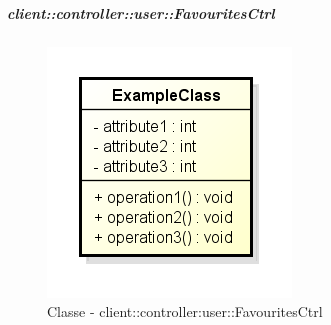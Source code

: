 		\subparagraph{client::controller::user::FavouritesCtrl} %
		\label{subp:client_controller_user_favouritesctrl}
			\begin{figure}[htbp]
				\centering
				\centerline{\includegraphics[scale=0.7]{./images/client/classes/example_class.png}}
				\caption{Classe - client::controller:user::FavouritesCtrl}
			\end{figure}
